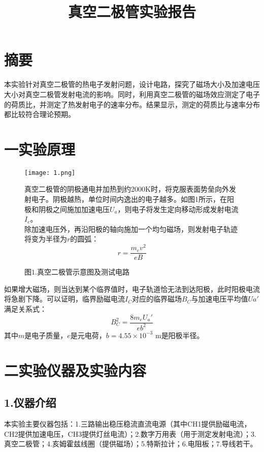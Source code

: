 \documentclass{ctexart}
\title{真空二极管实验报告}
\begin{document}
\maketitle

\section*{摘要}
本实验针对真空二极管的热电子发射问题，设计电路，探究了磁场大小及加速电压大小对真空二极管发射电流的影响。同时，利用真空二极管的磁场效应测定了电子的荷质比，并测定了热发射电子的速率分布。结果显示，测定的荷质比与速率分布都比较符合理论预期。

\section*{一\quad 实验原理}

\begin{figure}[H]
  \begin{minipage}[c]{0.5\linewidth}
    \texttt{[image: 1.png]}
    \caption*{图$1.$真空二极管示意图及测试电路}
   \end{minipage}
    \hspace{0.25cm}
    \begin{minipage}[c]{0.5\linewidth}
        真空二极管的阴极通电并加热到约2000K时，将克服表面势垒向外发射电子。阴极越热，单位时间内逸出的电子越多。如图1所示，在阳极和阴极之间施加加速电压$U_a$，则电子将发生定向移动形成发射电流$I_e$。\\

    除加速电压外，再沿阳极的轴向施加一个均匀磁场，则发射电子轨迹将变为半径为$r$的圆弧：
\begin{equation}
  r=\frac{m_ev^2}{eB}\tag{1}
\end{equation}
    \end{minipage}
\end{figure}

如果增大磁场，则当达到某个临界值时，电子轨道恰无法到达阳极，此时阳极电流将急剧下降。可以证明，临界励磁电流$I_C$对应的临界磁场$B_C$与加速电压平均值$Ua'$满足关系式：
\begin{equation}
  B_C^2=\frac{8m_eU_a'}{eb^2}\tag{2}
\end{equation}
其中$m$是电子质量，$e$是元电荷，$b=4.55\times 10^{-3}$  $\mathrm{m}$是阳极半径。
\section*{二\quad 实验仪器及实验内容}
\subsection*{1.\quad 仪器介绍}
本实验主要仪器包括：1.三路输出稳压稳流直流电源（其中CH1提供励磁电流，CH2提供加速电压，CH3提供灯丝电流）；2.数字万用表（用于测定发射电流）；3.真空二极管；4.亥姆霍兹线圈（提供磁场）；5.特斯拉计；6.电阻板；7.导线若干。
\end{document}
